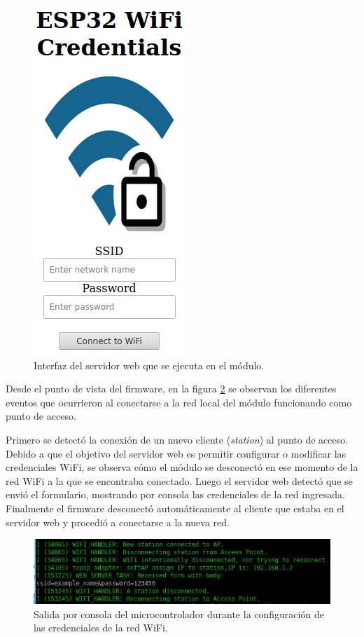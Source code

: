 \begin{figure}[h]
\centering
\includegraphics[scale=0.5]{./Figures/web_server_interface.png}
\caption{Interfaz del servidor web que se ejecuta en el módulo.}
\label{fig:web_server_interface}
\end{figure}

Desde el punto de vista del firmware, en la figura \ref{fig:output_web_server} se observan los diferentes eventos que ocurrieron al conectarse a la red local del módulo funcionando como punto de acceso.

Primero se detectó la conexión de un nuevo cliente (\emph{station}) al punto de acceso. Debido a que el objetivo del servidor web es permitir configurar o modificar las credenciales WiFi, se observa cómo el módulo se desconectó en ese momento de la red WiFi a la que se encontraba conectado. Luego el servidor web detectó que se envió el formulario, mostrando por consola las credenciales de la red ingresada. Finalmente el firmware desconectó automáticamente al cliente que estaba en el servidor web y procedió a conectarse a la nueva red.

\begin{figure}[h]
\centering
\includegraphics[width=\textwidth]{./Figures/output_web_server.png}
\caption{Salida por consola del microcontrolador durante la configuración de las credenciales de la red WiFi.}
\label{fig:output_web_server}
\end{figure}

